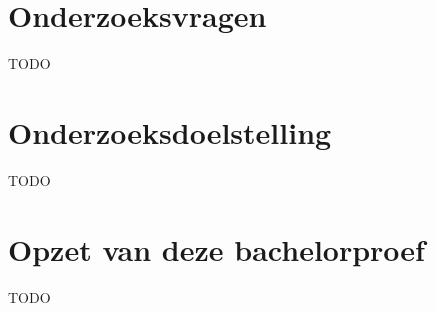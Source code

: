 
\section{Onderzoeksvragen}
\label{sec:onderzoeksvragen}
TODO


\section{Onderzoeksdoelstelling}
\label{sec:onderzoeksdoelstelling}
TODO


\section{Opzet van deze bachelorproef}
\label{sec:opzet-bachelorproef}
TODO

